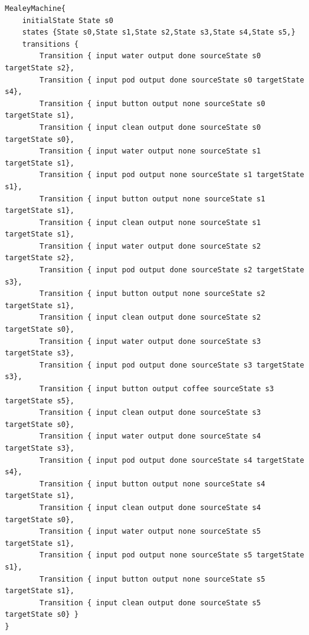 \begin{lstlisting}[caption=The output MealyMachine after running the implemented DHC algorithm with the input seen in Listing \ref{li:coffeemealy}.,label=li:coffeetttret,float,floatplacement=H]
MealeyMachine{
	initialState State s0
	states {State s0,State s1,State s2,State s3,State s4,State s5,}
	transitions {
		Transition { input water output done sourceState s0 targetState s2},
		Transition { input pod output done sourceState s0 targetState s4},
		Transition { input button output none sourceState s0 targetState s1},
		Transition { input clean output done sourceState s0 targetState s0},
		Transition { input water output none sourceState s1 targetState s1},
		Transition { input pod output none sourceState s1 targetState s1},
		Transition { input button output none sourceState s1 targetState s1},
		Transition { input clean output none sourceState s1 targetState s1},
		Transition { input water output done sourceState s2 targetState s2},
		Transition { input pod output done sourceState s2 targetState s3},
		Transition { input button output none sourceState s2 targetState s1},
		Transition { input clean output done sourceState s2 targetState s0},
		Transition { input water output done sourceState s3 targetState s3},
		Transition { input pod output done sourceState s3 targetState s3},
		Transition { input button output coffee sourceState s3 targetState s5},
		Transition { input clean output done sourceState s3 targetState s0},
		Transition { input water output done sourceState s4 targetState s3},
		Transition { input pod output done sourceState s4 targetState s4},
		Transition { input button output none sourceState s4 targetState s1},
		Transition { input clean output done sourceState s4 targetState s0},
		Transition { input water output none sourceState s5 targetState s1},
		Transition { input pod output none sourceState s5 targetState s1},
		Transition { input button output none sourceState s5 targetState s1},
		Transition { input clean output done sourceState s5 targetState s0} }
}
\end{lstlisting}